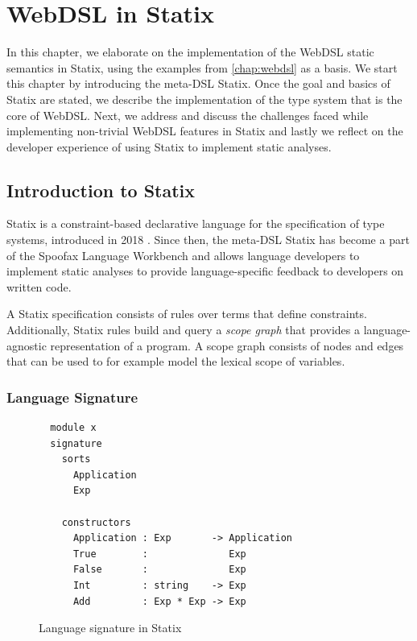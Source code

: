 
\chapter{\label{chap:statix}WebDSL in Statix}

  In this chapter, we elaborate on the implementation of the WebDSL static semantics in Statix, using the examples from \cref{chap:webdsl} as a basis. We start this chapter by introducing the meta-DSL Statix. Once the goal and basics of Statix are stated, we describe the implementation of the type system that is the core of WebDSL. Next, we address and discuss the challenges faced while implementing non-trivial WebDSL features in Statix and lastly we reflect on the developer experience of using Statix to implement static analyses.

  \section{\label{sec:statix}Introduction to Statix}

    Statix is a constraint-based declarative language for the specification of type systems, introduced in 2018 \autocite{VanAntwerpen2018}. Since then, the meta-DSL Statix has become a part of the Spoofax Language Workbench and allows language developers to implement static analyses to provide language-specific feedback to developers on written code.

    A Statix specification consists of rules over terms that define constraints. Additionally, Statix rules build and query a \textit{scope graph} \autocite{Neron2015} that provides a language-agnostic representation of a program. A scope graph consists of nodes and edges that can be used to for example model the lexical scope of variables.

    \subsection{Language Signature}

      \begin{figure}
        \vspace{-15pt}
        \capstart
        \begin{verbatim}
  module x
  signature
    sorts
      Application
      Exp
    
    constructors
      Application : Exp       -> Application
      True        :              Exp
      False       :              Exp
      Int         : string    -> Exp
      Add         : Exp * Exp -> Exp
        \end{verbatim}
        \caption{\label{fig:statix-signatures}Language signature in Statix}
        \vspace{-10pt}
      \end{figure}

